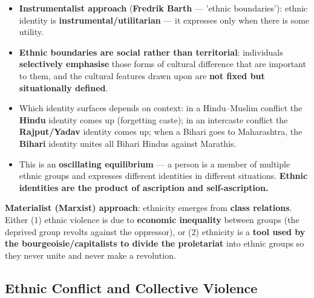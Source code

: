 \begin{KeyConcept}
\begin{itemize}
\item \textbf{Instrumentalist approach} (\textbf{Fredrik Barth} --- 'ethnic boundaries'): ethnic identity is \textbf{instrumental/utilitarian} --- it expresses only when there is some utility.
\item \textbf{Ethnic boundaries are social rather than territorial}: individuals \textbf{selectively emphasise} those forms of cultural difference that are important to them, and the cultural features drawn upon are \textbf{not fixed but situationally defined}.
\item Which identity surfaces depends on context: in a Hindu--Muslim conflict the \textbf{Hindu} identity comes up (forgetting caste); in an intercaste conflict the \textbf{Rajput/Yadav} identity comes up; when a Bihari goes to Maharashtra, the \textbf{Bihari} identity unites all Bihari Hindus against Marathis.
\item This is an \textbf{oscillating equilibrium} --- a person is a member of multiple ethnic groups and expresses different identities in different situations. \textbf{Ethnic identities are the product of ascription and self-ascription.}
\end{itemize}
\end{KeyConcept}

\begin{KeyConcept}
\textbf{Materialist (Marxist) approach}: ethnicity emerges from \textbf{class relations}. Either (1) ethnic violence is due to \textbf{economic inequality} between groups (the deprived group revolts against the oppressor), or (2) ethnicity is a \textbf{tool used by the bourgeoisie/capitalists to divide the proletariat} into ethnic groups so they never unite and never make a revolution.
\end{KeyConcept}

\subsection{Ethnic Conflict and Collective Violence}

